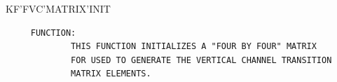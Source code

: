 \begin{frame}
KF'FVC'MATRIX'INIT
\begin{verbatim}
     FUNCTION:
             THIS FUNCTION INITIALIZES A "FOUR BY FOUR" MATRIX
             FOR USED TO GENERATE THE VERTICAL CHANNEL TRANSITION
             MATRIX ELEMENTS.

\end{verbatim}
\end{frame}
